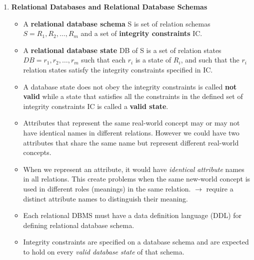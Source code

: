 \documentclass[10pt]{article}
\newcommand{\tf}{\textbf}
\newcommand{\ti}{\textit}
\begin{document}
\begin{enumerate}
	\item \tf{Relational Databases and Relational Database Schemas}
	\begin{itemize}
		\item A \tf{relational database schema} S is set of relation schemas $S = {R_1, R_2,\ldots, R_m}$ and a set of \tf{integrity constraints} IC.
		\item A \tf{relational database state} DB of S is a set of relation states $DB = {r_1, r_2,\ldots, r_m}$ such that each $r_i$ is a state of $R_i$, and such that the $r_i$ relation states satisfy the integrity constraints specified in IC. 
		\item A database state does not obey the integrity constraints is called \tf{not valid} while a state that satisfies all the constraints in the defined set of integrity constraints IC is called a \tf{valid state}.
		\item Attributes that represent the same real-world concept may or may not have identical names in different relations. However we could have two attributes that share the same name but represent different real-world concepts.
		\item When we represent an attribute, it would have \ti{identical attribute} names in all relations. This create problems when the same new-world concept is used in different roles (meanings) in the same relation. $\rightarrow$ require a distinct attribute names to distinguish their meaning.
		\item Each relational DBMS must have a data definition language (DDL) for defining relational database schema.
		\item Integrity constraints are specified on a database schema and are expected to hold on every \ti{valid database state} of that schema. 
	\end{itemize}


\end{enumerate}
\end{document}
